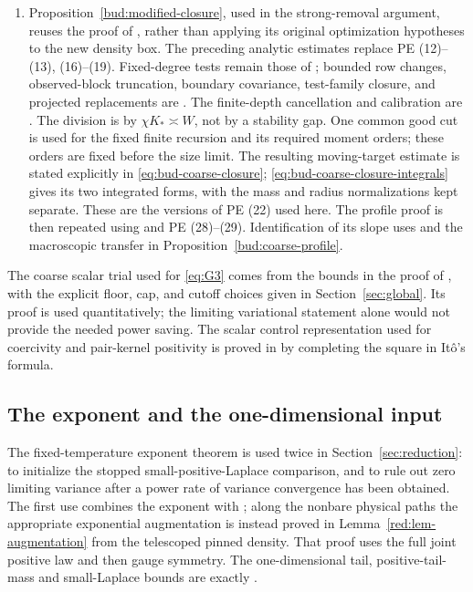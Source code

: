 \begin{enumerate}
\item Proposition~\ref{bud:modified-closure}, used in the strong-removal
argument, reuses the proof of
\cite[Proposition~4.1]{PE}, rather than applying its original
optimization hypotheses to the new density box. The preceding
analytic estimates replace PE (12)--(13), (16)--(19). Fixed-degree
tests remain those of \cite[Definition~4.2]{PE}; bounded row changes,
observed-block truncation, boundary covariance, test-family closure,
and projected replacements are \cite[Lemmas~4.3--4.8]{PE}.
The finite-depth cancellation and calibration are
\cite[Lemmas~4.9--4.10, equations~(23)--(27)]{PE}.
The division is by $\chi K_*\asymp W$, not by a stability gap.
One common good cut is used for the fixed finite recursion and its
required moment orders; these orders are fixed before the size limit.
The resulting moving-target estimate is stated explicitly in
\eqref{eq:bud-coarse-closure}; \eqref{eq:bud-coarse-closure-integrals}
gives its two integrated forms, with the mass and radius normalizations
kept separate. These are the versions of PE (22) used here.
The profile proof is then repeated using \cite[Lemmas~5.3--5.6]{PE}
and PE (28)--(29). Identification of its slope uses
\cite[Lemma~5.8 and Proposition~5.9]{PE} and the macroscopic transfer
in Proposition~\ref{bud:coarse-profile}.
\end{enumerate}

The coarse scalar trial used for \eqref{eq:G3} comes from the bounds
in the proof of \cite[Lemma~5.7]{PE}, with the explicit floor, cap,
and cutoff choices given in Section~\ref{sec:global}. Its proof is
used quantitatively; the limiting variational statement alone would
not provide the needed power saving. The scalar control representation
used for coercivity and pair-kernel positivity is proved in
\cite[proof of Lemma~5.8]{PE} by completing the square in It\^o's
formula.

\subsection{The exponent and the one-dimensional input}

The fixed-temperature exponent theorem \cite[Theorem~1.1]{PE} is
used twice in Section~\ref{sec:reduction}: to initialize the stopped
small-positive-Laplace comparison, and to rule out zero limiting
variance after a power rate of variance convergence has been obtained.
The first use combines the exponent with
\cite[Lemmas~7.6--7.7]{PE}; along the nonbare physical paths the
appropriate exponential augmentation is instead proved in
Lemma~\ref{red:lem-augmentation} from the telescoped pinned density.
That proof uses the full joint positive law and then gauge symmetry.
The one-dimensional tail, positive-tail-mass and small-Laplace bounds
are exactly \cite[Lemma~7.7]{PE}.

